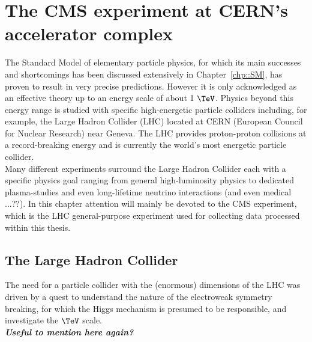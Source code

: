 \chapter{The CMS experiment at CERN's accelerator complex} \label{chp:CERN}

The Standard Model of elementary particle physics, for which its main successes and shortcomings has been discussed extensively in Chapter~\ref{chp::SM}, has proven to result in very precise predictions. However it is only acknowledged as an effective theory up to an energy scale of about 1 $\TeV$. Physics beyond this energy range is studied with specific high-energetic particle colliders including, for example, the Large Hadron Collider (LHC) located at CERN (European Council for Nuclear Research) near Geneva. The LHC provides proton-proton collisions at a record-breaking energy and is currently the world's most energetic particle collider.\\
Many different experiments surround the Large Hadron Collider each with a specific physics goal ranging from general high-luminosity physics to dedicated plasma-studies and even long-lifetime neutrino interactions (and even medical ...??).
In this chapter attention will mainly be devoted to the CMS experiment, which is the LHC general-purpose experiment used for collecting data processed within this thesis.

\section{The Large Hadron Collider}
The need for a particle collider with the (enormous) dimensions of the LHC was driven by a quest to understand the nature of the electroweak symmetry breaking, for which the Higgs mechanism is presumed to be responsible, and investigate the $\TeV$ scale.
\\
\textit{\textbf{Useful to mention here again?}}
\\

